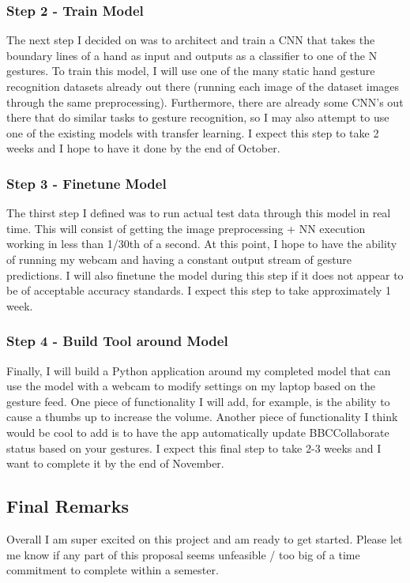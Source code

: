 \documentclass[11pt]{article}
\begin{document}
\subsubsection{Step 2 - Train Model}
The next step I decided on was to architect and train a CNN that takes the boundary lines of a hand as input and outputs as a classifier to one of the N gestures. To train this model, I will use one of the many static hand gesture recognition datasets already out there (running each image of the dataset images through the same preprocessing). Furthermore, there are already some CNN's out there that do similar tasks to gesture recognition, so I may also attempt to use one of the existing models with transfer learning. I expect this step to take 2 weeks and I hope to have it done by the end of October.

\subsubsection{Step 3 - Finetune Model}
The thirst step I defined was to run actual test data through this model in real time. This will consist of getting the image preprocessing + NN execution working in less than 1/30th of a second.  At this point, I hope to have the ability of running my webcam and having a constant output stream of gesture predictions. I will also finetune the model during this step if it does not appear to be of acceptable accuracy standards. I expect this step to take approximately 1 week. 

\subsubsection{Step 4 - Build Tool around Model}
Finally, I will build a Python application around my completed model that can use the model with a webcam to modify settings on my laptop based on the gesture feed. One piece of functionality I will add, for example, is the ability to cause a thumbs up to increase the volume. Another piece of functionality I think would be cool to add is to have the app automatically update BBCCollaborate status based on your gestures. I expect this final step to take 2-3 weeks and I want to complete it by the end of November.

\subsection{Final Remarks}
Overall I am super excited on this project and am ready to get started. Please let me know if any part of this proposal seems unfeasible / too big of a time commitment to complete within a semester.
\end{document}
